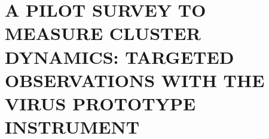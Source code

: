 %
%
%


\renewcommand*{\thefootnote}{\fnsymbol{footnote}}
\chapter[\uppercase{A pilot survey to measure Cluster Dynamics: Targeted Observations with the VIRUS Prototype Instrument}]{\uppercase{A pilot survey to measure Cluster Dynamics: Targeted Observations with the VIRUS Prototype Instrument}}%
\setcounter{footnote}{0}


